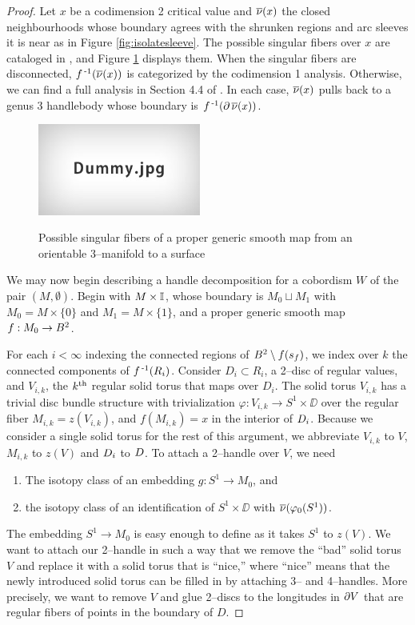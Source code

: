 \begin{proof}
	Let $x$ be a codimension 2 critical value and $\overline{\nu}(x)$ the closed neighbourhoods whose boundary agrees with the shrunken regions and arc sleeves it is near as in Figure \ref{fig:isolatesleeve}.
	The possible singular fibers over $x$ are cataloged in \cite{Saeki}, and Figure \ref{fig:saekising} displays them.
	When the singular fibers are disconnected, $f^{\,\text{-}1}(\overline{\nu}(x))$ is categorized by the codimension 1 analysis.
	Otherwise, we can find a full analysis in Section 4.4 of \cite{CostThur08}.
	In each case, $\overline{\nu}(x)$ pulls back to a genus 3 handlebody whose boundary is $f^{\,\text{-}1}(\partial\,\overline{\nu}(x))$.
	
	\begin{figure}
		\centering
		\captionsetup{justification=centering}
		\caption{Possible singular fibers of a proper generic smooth map from an orientable 3--manifold to a surface}
		\includegraphics[height=3cm]{figures/dummy.jpg}
		\label{fig:saekising}
	\end{figure}
	
	We may now begin describing a handle decomposition for a cobordism $W$ of the pair $(M,\emptyset)$.
	Begin with $M\times\mathbb{I}$, whose boundary is $M_0\sqcup M_1$ with $M_0=M\times\{0\}$ and $M_1 = M\times\{1\}$, and a proper generic smooth map $f:M_0\to B^2$.

	For each $i<\infty$ indexing the connected regions of $B^2\setminus f(s_f)$, we index over $k$ the connected components of $f^{\,\text{-}1}(R_i)$.
	Consider $D_i\subset R_i$, a 2--disc of regular values, and $V_{i,k}$, the $k^{\text{th}}$ regular solid torus that maps over $D_i$.
	The solid torus $V_{i,k}$ has a trivial disc bundle structure with trivialization $\varphi:V_{i,k}\to S^1\times\DD$ over the regular fiber $M_{i,k}=z(V_{i,k})$, and $f(M_{i,k})=x$ in the interior of $D_i$.
	Because we consider a single solid torus for the rest of this argument, we abbreviate $V_{i,k}$ to $V$, $M_{i,k}$ to $z(V)$ and $D_i$ to $D$.
	To attach a 2--handle over $V$, we need
	\begin{enumerate}
		\item The isotopy class of an embedding $g:S^1\to M_0$, and
		\item the isotopy class of an identification of $S^1\times\DD$ with $\overline{\nu}(\varphi_0(S^1))$.
	\end{enumerate}
	The embedding $S^1\to M_0$ is easy enough to define as it takes $S^1$ to $z(V)$.
	We want to attach our 2--handle in such a way that we remove the ``bad'' solid torus $V$ and replace it with a solid torus that is ``nice,'' where ``nice'' means that the newly introduced solid torus can be filled in by attaching 3-- and 4--handles.
	More precisely, we want to remove $V$ and glue 2--discs to the longitudes in $\partial V$ that are regular fibers of points in the boundary of $D$.
	

\end{proof}
